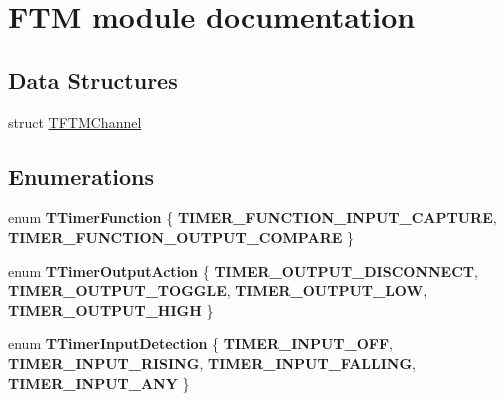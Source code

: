 \hypertarget{group___f_t_m__module}{}\section{F\+T\+M module documentation}
\label{group___f_t_m__module}
\subsection*{Data Structures}
\begin{DoxyCompactItemize}
\item 
struct \hyperlink{struct_t_f_t_m_channel}{T\+F\+T\+M\+Channel}
\end{DoxyCompactItemize}
\subsection*{Enumerations}
\begin{DoxyCompactItemize}
\item 
\hypertarget{group___f_t_m__module_ga830315c3626b559a4ec857bef198cf7b}{}enum {\bfseries T\+Timer\+Function} \{ {\bfseries T\+I\+M\+E\+R\+\_\+\+F\+U\+N\+C\+T\+I\+O\+N\+\_\+\+I\+N\+P\+U\+T\+\_\+\+C\+A\+P\+T\+U\+R\+E}, 
{\bfseries T\+I\+M\+E\+R\+\_\+\+F\+U\+N\+C\+T\+I\+O\+N\+\_\+\+O\+U\+T\+P\+U\+T\+\_\+\+C\+O\+M\+P\+A\+R\+E}
 \}\label{group___f_t_m__module_ga830315c3626b559a4ec857bef198cf7b}

\item 
\hypertarget{group___f_t_m__module_gad5f2367d930015e42d1b0db18249ac44}{}enum {\bfseries T\+Timer\+Output\+Action} \{ {\bfseries T\+I\+M\+E\+R\+\_\+\+O\+U\+T\+P\+U\+T\+\_\+\+D\+I\+S\+C\+O\+N\+N\+E\+C\+T}, 
{\bfseries T\+I\+M\+E\+R\+\_\+\+O\+U\+T\+P\+U\+T\+\_\+\+T\+O\+G\+G\+L\+E}, 
{\bfseries T\+I\+M\+E\+R\+\_\+\+O\+U\+T\+P\+U\+T\+\_\+\+L\+O\+W}, 
{\bfseries T\+I\+M\+E\+R\+\_\+\+O\+U\+T\+P\+U\+T\+\_\+\+H\+I\+G\+H}
 \}\label{group___f_t_m__module_gad5f2367d930015e42d1b0db18249ac44}

\item 
\hypertarget{group___f_t_m__module_ga94108be49a2464d06bf383b3dc1a218e}{}enum {\bfseries T\+Timer\+Input\+Detection} \{ {\bfseries T\+I\+M\+E\+R\+\_\+\+I\+N\+P\+U\+T\+\_\+\+O\+F\+F}, 
{\bfseries T\+I\+M\+E\+R\+\_\+\+I\+N\+P\+U\+T\+\_\+\+R\+I\+S\+I\+N\+G}, 
{\bfseries T\+I\+M\+E\+R\+\_\+\+I\+N\+P\+U\+T\+\_\+\+F\+A\+L\+L\+I\+N\+G}, 
{\bfseries T\+I\+M\+E\+R\+\_\+\+I\+N\+P\+U\+T\+\_\+\+A\+N\+Y}
 \}\label{group___f_t_m__module_ga94108be49a2464d06bf383b3dc1a218e}

\end{DoxyCompactItemize}
